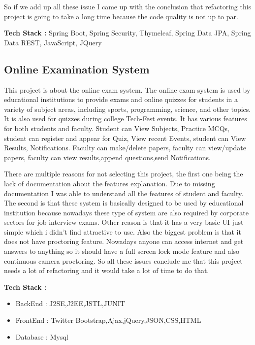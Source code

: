 \documentclass[12pt,english]{article}
\begin{document}
    So if we add up all these issue I came up with the conclusion that refactoring this project is going to take a long time because the code quality is not up to par.
    
    \vspace{0.5cm}
    
    \textbf{Tech Stack : } Spring Boot, Spring Security, Thymeleaf, Spring Data JPA, Spring Data REST, JavaScript, JQuery

    \subsection{Online Examination System}
    This project is about the online exam system. The online exam system is used by educational institutions to provide exams and online quizzes for students in a variety of subject areas, including sports, programming, science, and other topics. It is also used for quizzes during college Tech-Fest events. It has various features for both students and faculty. Student can View Subjects, Practice MCQs, student can register and appear for Quiz, View recent Events, student can View Results, Notifications. Faculty can make/delete papers, faculty can view/update papers, faculty can view results,append questions,send Notifications. 

    There are multiple reasons for not selecting this project, the first one being the lack of documentation about the features explanation. Due to missing documentation I was able to understand all the features of student and faculty. The second is that these system is basically designed to be used by educational institution because nowadays these type of system are also required by corporate sectors for job interview exams. Other reason is that it has a very basic UI just simple  which i didn't find attractive to use. Also the biggest problem is that it does not have proctoring feature. Nowadays anyone can access internet and get answers to anything so it should have a full screen lock mode feature and also continuous camera proctoring.  So all these issues conclude me that this project needs a lot of refactoring and it would take a lot of time to do that.

    \vspace{0.5cm}
    
    \textbf{Tech Stack : } 
    \begin{itemize}
        \item BackEnd : J2SE,J2EE,JSTL,JUNIT
        \item FrontEnd : Twitter Bootstrap,Ajax,jQuery,JSON,CSS,HTML    
        \item Database : Mysql
    \end{itemize}
    
\end{document}
